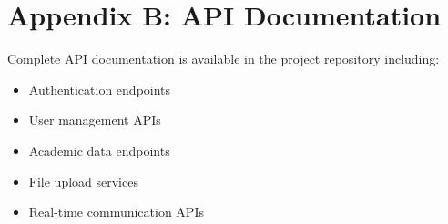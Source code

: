 \section*{Appendix B: API Documentation}

Complete API documentation is available in the project repository including:
\begin{itemize}
\item Authentication endpoints
\item User management APIs
\item Academic data endpoints
\item File upload services
\item Real-time communication APIs
\end{itemize}
